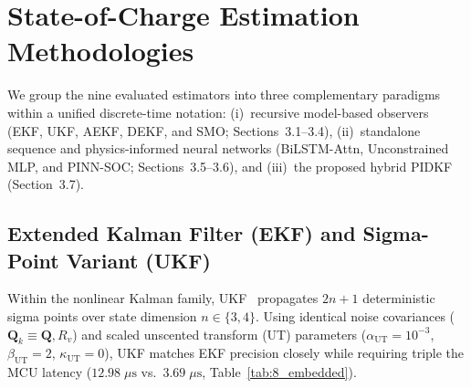 \documentclass[10pt,a4paper]{article}
\providecommand{\upmu}{\mu}
\begin{document}
\section{State-of-Charge Estimation Methodologies}
We group the nine evaluated estimators into three complementary paradigms within a unified discrete-time notation: (i)~recursive model-based observers (EKF, UKF, AEKF, DEKF, and SMO; Sections~3.1--3.4), (ii)~standalone sequence and physics-informed neural networks (BiLSTM-Attn, Unconstrained MLP, and PINN-SOC; Sections~3.5--3.6), and (iii)~the proposed hybrid PIDKF (Section~3.7).

\subsection{Extended Kalman Filter (EKF) and Sigma-Point Variant (UKF)}
Within the nonlinear Kalman family, UKF~\cite{Plett2006ukf,He2013ukf} propagates $2n+1$ deterministic sigma points over state dimension $n \in \{3,4\}$. Using identical noise covariances ($\mathbf{Q}_k \equiv \mathbf{Q}, R_v$) and scaled unscented transform (UT) parameters ($\alpha_{\text{UT}} = 10^{-3}$, $\beta_{\text{UT}} = 2$, $\kappa_{\text{UT}} = 0$), UKF matches EKF precision closely while requiring triple the MCU latency ($12.98\;\upmu\mathrm{s}$ vs.\ $3.69\;\upmu\mathrm{s}$, Table~\ref{tab:8_embedded}).
\end{document}
